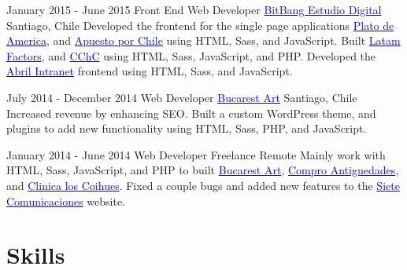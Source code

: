 \documentclass[11pt,a4paper,sans]{moderncv}        %
\begin{document}
\cventry
  {January 2015 - June 2015}
  {Front End Web Developer}
  {\textmd{\href{http://bitbang.cl}{\textcolor{blue}{BitBang Estudio Digital}}}}
  {\textmd{Santiago, Chile}}{}
  {
    Developed the frontend for the single page applications \href{http://bitbang.cl/portafolio/plato-de-america/}{\textcolor{blue}{Plato de America}}, and \href{http://bitbang.cl/portafolio/apuesto-por-chile/}{\textcolor{blue}{Apuesto por Chile}} using HTML, Sass, and JavaScript.
    Built \textmd{\href{http://www.latamfactors.cl}{\textcolor{blue}{Latam Factors}}}, and \textmd{\href{http://www.cchc.cl}{\textcolor{blue}{CChC}}} using HTML, Sass, JavaScript, and PHP.
    Developed the \href{http://abrilintranet.cl/}{\textcolor{blue}{Abril Intranet}} frontend using HTML, Sass, and JavaScript.
  }

\cventry  
  {July 2014 - December 2014}
  {Web Developer}
  {\textmd{\href{http://bucarestart.cl}{\textcolor{blue}{Bucarest Art}}}}
  {\textmd{Santiago, Chile}}{}
  {
    Increased revenue by enhancing SEO.
    Built a custom WordPress theme, and plugins to add new functionality using HTML, Sass, PHP, and JavaScript.
  }

\cventry
  {January 2014 - June 2014}
  {Web Developer}
  {\textmd{Freelance}}
  {\textmd{Remote}}{}
  {
    Mainly work with HTML, Sass, JavaScript, and PHP to built \textmd{\href{http://bucarestart.cl}{\textcolor{blue}{Bucarest Art}}},
    \textmd{\href{https://web.archive.org/web/20160306131956/http://comproantiguedades.cl/}{\textcolor{blue}{Compro Antiguedades}}},
    and \textmd{\href{http://www.clinicaloscoihues.cl/}{\textcolor{blue}{Clinica los Coihues}}}.
    Fixed a couple bugs and added new features to the \textmd{\href{http://www.sietecomunicaciones.cl/}{\textcolor{blue}{Siete Comunicaciones}}} website.
  }

\section{Skills}
\end{document}
